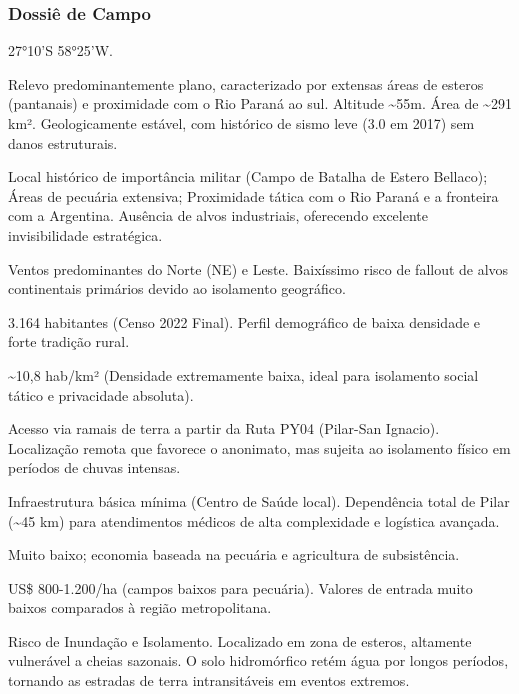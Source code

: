 \subsubsection{Dossiê de Campo}
\begin{description}[style=nextline,leftmargin=0.5cm,font=\bfseries]
\item[Coordenadas]  27°10'S 58°25'W.
\item[Topografia]  Relevo predominantemente plano, caracterizado por extensas áreas de esteros (pantanais) e proximidade com o Rio Paraná ao sul. Altitude \textasciitilde 55m. Área de \textasciitilde 291 km². Geologicamente estável, com histórico de sismo leve (3.0 em 2017) sem danos estruturais.
\item[Alvos Estratégicos]  Local histórico de importância militar (Campo de Batalha de Estero Bellaco); Áreas de pecuária extensiva; Proximidade tática com o Rio Paraná e a fronteira com a Argentina. Ausência de alvos industriais, oferecendo excelente invisibilidade estratégica.
\item[Fallout]  Ventos predominantes do Norte (NE) e Leste. Baixíssimo risco de fallout de alvos continentais primários devido ao isolamento geográfico.
\item[População]  3.164 habitantes (Censo 2022 Final). Perfil demográfico de baixa densidade e forte tradição rural.
\item[Densidade]  \textasciitilde 10,8 hab/\allowbreak km² (Densidade extremamente baixa, ideal para isolamento social tático e privacidade absoluta).
\item[Vias de Acesso]  Acesso via ramais de terra a partir da Ruta PY04 (Pilar-San Ignacio). Localização remota que favorece o anonimato, mas sujeita ao isolamento físico em períodos de chuvas intensas.
\item[Serviços]  Infraestrutura básica mínima (Centro de Saúde local). Dependência total de Pilar (\textasciitilde 45 km) para atendimentos médicos de alta complexidade e logística avançada.
\item[Custo de Vida]  Muito baixo; economia baseada na pecuária e agricultura de subsistência.
\item[Preço da Terra]  US\$ 800-1.200/\allowbreak ha (campos baixos para pecuária). Valores de entrada muito baixos comparados à região metropolitana.
\item[Hidrologia]  Risco de Inundação e Isolamento. Localizado em zona de esteros, altamente vulnerável a cheias sazonais. O solo hidromórfico retém água por longos períodos, tornando as estradas de terra intransitáveis em eventos extremos.

\end{description}
